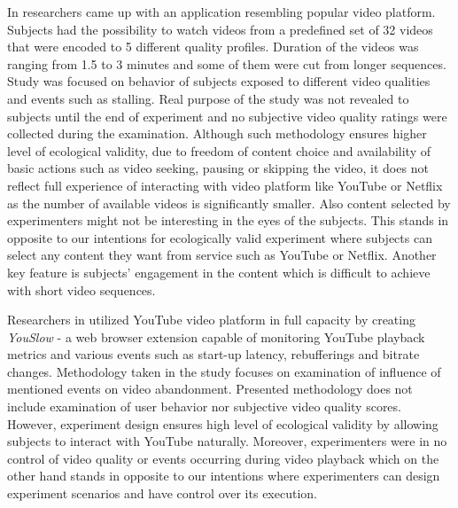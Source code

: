 \documentclass[conference]{IEEEtran}
\begin{document}
    In \cite{custom_yt_like_app} researchers came up with an application resembling popular video platform. Subjects had the possibility to watch videos from a predefined set of 32 videos that were encoded to 5 different quality profiles. Duration of the videos was ranging from 1.5 to 3 minutes and some of them were cut from longer sequences. 
    Study was focused on behavior of subjects exposed to different video qualities and events such as stalling. 
    Real purpose of the study was not revealed to subjects until the end of experiment and no subjective video quality ratings were collected during the examination.
    Although such methodology ensures higher level of ecological validity, due to freedom of content choice and availability of basic actions such as video seeking, pausing or skipping the video, it does not reflect full experience of interacting with video platform like YouTube or Netflix as the number of available videos is significantly smaller. Also content selected by experimenters might not be interesting in the eyes of the subjects. 
    This stands in opposite to our intentions for ecologically valid experiment where subjects can select any content they want from service such as YouTube or Netflix. Another key feature is subjects' engagement in the content which is difficult to achieve with short video sequences.
    
    Researchers in \cite{you_slow} utilized YouTube video platform in full capacity by creating \textit{YouSlow} - a web browser extension capable of monitoring YouTube playback metrics and various events such as start-up latency, rebufferings and bitrate changes.
    Methodology taken in the study focuses on examination of influence of mentioned events on video abandonment.
    Presented methodology does not include examination of user behavior nor subjective video quality scores.
    However, experiment design ensures high level of ecological validity by allowing subjects to interact with YouTube naturally. 
    Moreover, experimenters were in no control of video quality or events occurring during video playback which on the other hand stands in opposite to our intentions where experimenters can design experiment scenarios and have control over its execution.
    
\end{document}

